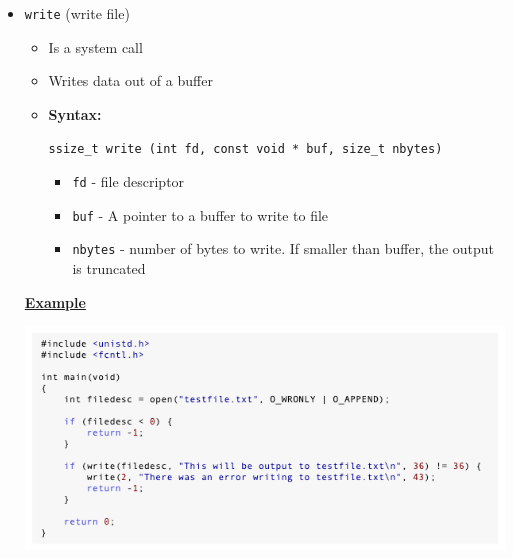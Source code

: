 \documentclass[12pt]{article}
\begin{document}
\begin{enumerate}[1.]
\begin{enumerate}
\begin{itemize}
\begin{itemize}
\begin{itemize}
                \end{itemize}

                \item \texttt{write} (write file)

                \begin{itemize}
                    \item Is a system call
                    \item Writes data out of a buffer
                    \item \textbf{Syntax:}

                    \bigskip

                    \texttt{ssize\_t write (int fd, const void * buf, size\_t nbytes)}

                    \bigskip

                    \begin{itemize}
                        \item \texttt{fd} - file descriptor
                        \item \texttt{buf} - A pointer to a buffer to write to file
                        \item \texttt{nbytes} - number of bytes to write. If smaller than buffer, the output is truncated
                    \end{itemize}
                \end{itemize}

                \bigskip

                \underline{\textbf{Example}}

                \bigskip

                \begin{center}
                \includegraphics[width=\linewidth]{../images/midterm_4_solution_4.png}
                \end{center}


\end{itemize}
\end{itemize}
\end{enumerate}
\end{enumerate}
\end{document}
